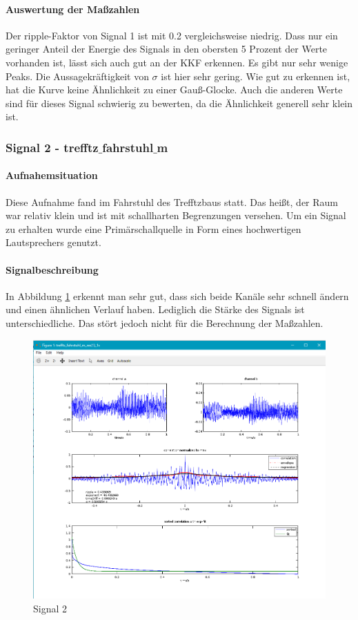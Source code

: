 \paragraph{Auswertung der Maßzahlen}
Der ripple-Faktor von Signal 1 ist mit 0.2 vergleichsweise niedrig. Dass nur ein geringer Anteil der Energie des Signals in den obersten 5 Prozent der Werte vorhanden ist, lässt sich auch gut an der KKF erkennen. Es gibt nur sehr wenige Peaks. Die Aussagekräftigkeit von $\sigma$ ist hier sehr gering. Wie gut zu erkennen ist, hat die Kurve keine Ähnlichkeit zu einer Gauß-Glocke. Auch die anderen Werte sind für dieses Signal schwierig zu bewerten, da die Ähnlichkeit generell sehr klein ist.
\subsubsection{Signal 2 - trefftz$\_$fahrstuhl$\_$m}
\paragraph{Aufnahemsituation} Diese Aufnahme fand im Fahrstuhl des Trefftzbaus statt. Das heißt, der Raum war relativ klein und ist mit schallharten Begrenzungen versehen. Um ein Signal zu erhalten wurde eine Primärschallquelle in Form eines hochwertigen Lautsprechers genutzt.
\paragraph{Signalbeschreibung}
In Abbildung \ref{figure3}  erkennt man sehr gut, dass sich beide Kanäle sehr schnell ändern und einen ähnlichen Verlauf haben. Lediglich die Stärke des Signals ist unterschiedliche. Das stört jedoch nicht für die Berechnung der Maßzahlen. 
\begin{figure}[ht!]
  \centering
  \includegraphics[scale=0.64]{img/trefftz_fahrstuhl_m}
  \caption{Signal 2}
  \label{figure3}
\end{figure}

